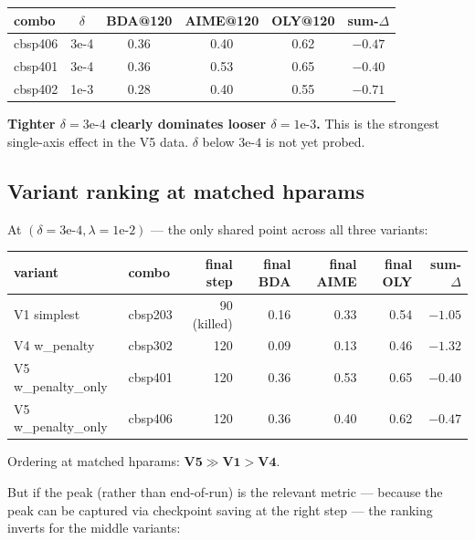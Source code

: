 \documentclass[10pt]{article}
\begin{document}
\begin{center}
\begin{tabular}{lccccc}
\toprule
combo    & $\delta$  & BDA@120 & AIME@120 & OLY@120 & sum-$\Delta$ \\
\midrule
cbsp406  & 3e-4      & 0.36    & 0.40     & 0.62    & $-0.47$ \\
cbsp401  & 3e-4      & 0.36    & 0.53     & 0.65    & $-0.40$ \\
cbsp402  & 1e-3      & 0.28    & 0.40     & 0.55    & $-0.71$ \\
\bottomrule
\end{tabular}
\end{center}

\noindent \textbf{Tighter $\delta=3\text{e-}4$ clearly dominates looser
$\delta=1\text{e-}3$.} This is the strongest single-axis effect in the
V5 data. $\delta$ below $3\text{e-}4$ is not yet probed.

\subsection{Variant ranking at matched hparams}

At $(\delta=3\text{e-}4, \lambda=1\text{e-}2)$ --- the only shared
point across all three variants:

\begin{center}
\begin{tabular}{llrrrrr}
\toprule
variant              & combo    & final step & final BDA   & final AIME & final OLY & sum-$\Delta$ \\
\midrule
V1 simplest          & cbsp203  & 90 (killed) & 0.16       & 0.33       & 0.54      & $-1.05$ \\
V4 w\_penalty        & cbsp302  & 120        & 0.09        & 0.13       & 0.46      & $-1.32$ \\
V5 w\_penalty\_only  & cbsp401  & 120        & 0.36        & 0.53       & 0.65      & $-0.40$ \\
V5 w\_penalty\_only  & cbsp406  & 120        & 0.36        & 0.40       & 0.62      & $-0.47$ \\
\bottomrule
\end{tabular}
\end{center}

\noindent Ordering at matched hparams: $\textbf{V5} \gg \textbf{V1} >
\textbf{V4}$.

But if the peak (rather than end-of-run) is the relevant metric ---
because the peak can be captured via checkpoint saving at the right
step --- the ranking inverts for the middle variants:
\end{document}

